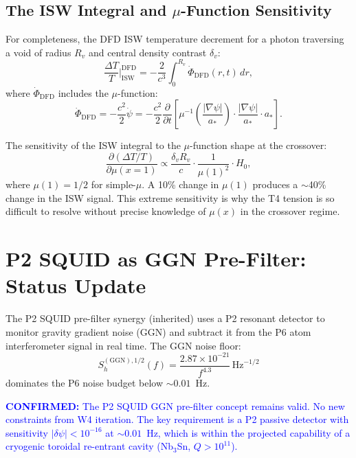 \documentclass[11pt]{article}
\theoremstyle{definition}
\theoremstyle{remark}
\newcommand{\ee}[1]{\times10^{#1}}
\newcommand{\sqrtHz}{\,\mathrm{Hz}^{-1/2}}
\newcommand{\astar}{a_*}
\newcommand{\confirmed}[1]{\textcolor{blue}{\textbf{CONFIRMED:} #1}}
\begin{document}
\subsection{The ISW Integral and $\mu$-Function Sensitivity}

For completeness, the DFD ISW temperature decrement for a photon
traversing a void of radius $R_v$ and central density contrast $\delta_v$:
\begin{equation}
\frac{\Delta T}{T}\bigg|_{\mathrm{ISW}}^{\mathrm{DFD}}
= -\frac{2}{c^3} \int_0^{R_v} \dot{\Phi}_{\mathrm{DFD}}(r, t)\,dr,
\end{equation}
where $\dot{\Phi}_{\mathrm{DFD}}$ includes the $\mu$-function:
\begin{equation}
\dot{\Phi}_{\mathrm{DFD}} = -\frac{c^2}{2}\dot{\psi}
= -\frac{c^2}{2}\frac{\partial}{\partial t}\left[
\mu^{-1}\left(\frac{|\nabla\psi|}{\astar}\right)
\cdot \frac{|\nabla\psi|}{\astar} \cdot \astar
\right].
\end{equation}

The sensitivity of the ISW integral to the $\mu$-function shape at
the crossover:
\begin{equation}
\frac{\partial(\Delta T/T)}{\partial \mu(x=1)}
\propto \frac{\delta_v R_v}{c} \cdot \frac{1}{\mu(1)^2} \cdot H_0,
\end{equation}
where $\mu(1) = 1/2$ for simple-$\mu$. A 10\% change in $\mu(1)$
produces a $\sim$40\% change in the ISW signal. This extreme sensitivity
is why the T4 tension is so difficult to resolve without precise knowledge
of $\mu(x)$ in the crossover regime.

\section{P2 SQUID as GGN Pre-Filter: Status Update}
\label{sec:p2-ggn}

The P2 SQUID pre-filter synergy (inherited) uses a P2 resonant detector
to monitor gravity gradient noise (GGN) and subtract it from the P6
atom interferometer signal in real time. The GGN noise floor:
\begin{equation}
S_h^{(\mathrm{GGN}),1/2}(f) = \frac{2.87\ee{-21}}{f^{4.3}}\sqrtHz
\end{equation}
dominates the P6 noise budget below $\sim 0.01$~Hz.

\confirmed{The P2 SQUID GGN pre-filter concept remains valid. No new
constraints from W4 iteration. The key requirement is a P2 passive
detector with sensitivity $|\delta\psi| < 10^{-16}$ at $\sim 0.01$~Hz,
which is within the projected capability of a cryogenic toroidal
re-entrant cavity (Nb$_3$Sn, $Q > 10^{11}$).}
\end{document}
